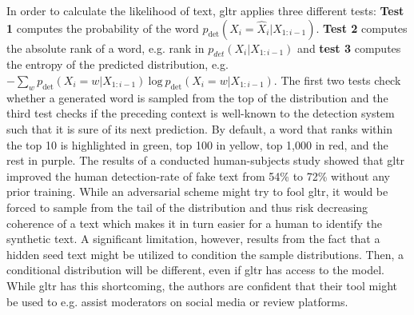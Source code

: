 In order to calculate the likelihood of text, \gls{gltr} applies three different tests: \textbf{Test 1} computes the probability of the word $ p_{\text{det}}(X_i = \hat{X}_i | X_{1:i-1}) $. \textbf{Test 2} computes the absolute rank of a word, e.g. rank in $ p_{det}(X_i | X_{1:i-1}) $ and \textbf{test 3} computes the entropy of the predicted distribution, e.g. $ - \sum_w p_{\text{det}}(X_i = w | X_{1:i-1}) \ \text{log} \ p_{\text{det}}(X_i = w | X_{1:i-1}) $. The first two tests check whether a generated word is sampled from the top of the distribution and the third test checks if the preceding context is well-known to the detection system such that it is sure of its next prediction. By default, a word that ranks within the top 10 is highlighted in green, top 100 in yellow, top 1,000 in red, and the rest in purple. The results of a conducted human-subjects study showed that \gls{gltr} improved the human detection-rate of fake text from 54\% to 72\% without any prior training. While an adversarial scheme might try to fool \gls{gltr}, it would be forced to sample from the tail of the distribution and thus risk decreasing coherence of a text which makes it in turn easier for a human to identify the synthetic text. A significant limitation, however, results from the fact that a hidden seed text might be utilized to condition the sample distributions. Then, a conditional distribution will be different, even if \gls{gltr} has access to the model. While \gls{gltr} has this shortcoming, the authors are confident that their tool might be used to e.g. assist moderators on social media or review platforms.
